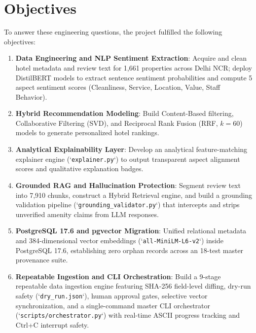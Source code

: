 \section{Objectives}
To answer these engineering questions, the project fulfilled the following objectives:
\begin{enumerate}
    \item \textbf{Data Engineering and NLP Sentiment Extraction}: Acquire and clean hotel metadata and review text for 1,661 properties across Delhi NCR; deploy DistilBERT models to extract sentence sentiment probabilities and compute 5 aspect sentiment scores (Cleanliness, Service, Location, Value, Staff Behavior).
    \item \textbf{Hybrid Recommendation Modeling}: Build Content-Based filtering, Collaborative Filtering (SVD), and Reciprocal Rank Fusion (RRF, $k=60$) models to generate personalized hotel rankings.
    \item \textbf{Analytical Explainability Layer}: Develop an analytical feature-matching explainer engine (`\texttt{explainer.py}`) to output transparent aspect alignment scores and qualitative explanation badges.
    \item \textbf{Grounded RAG and Hallucination Protection}: Segment review text into 7,910 chunks, construct a Hybrid Retrieval engine, and build a grounding validation pipeline (`\texttt{grounding\_validator.py}`) that intercepts and strips unverified amenity claims from LLM responses.
    \item \textbf{PostgreSQL 17.6 and pgvector Migration}: Unified relational metadata and 384-dimensional vector embeddings (`\texttt{all-MiniLM-L6-v2}`) inside PostgreSQL 17.6, establishing zero orphan records across an 18-test master provenance suite.
    \item \textbf{Repeatable Ingestion and CLI Orchestration}: Build a 9-stage repeatable data ingestion engine featuring SHA-256 field-level diffing, dry-run safety (`\texttt{dry\_run.json}`), human approval gates, selective vector synchronization, and a single-command master CLI orchestrator (`\texttt{scripts/orchestrator.py}`) with real-time ASCII progress tracking and Ctrl+C interrupt safety.
\end{enumerate}

